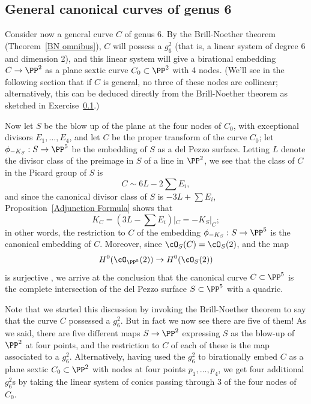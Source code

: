 \subsection{General canonical curves of genus 6}

Consider now a general curve $C$ of genus 6. By the Brill-Noether theorem (Theorem~\ref{BN omnibus}), $C$ will possess a $g^2_6$ (that is, a linear system of degree 6 and dimension 2), and this linear system will give a birational embedding $C \to \PP^2$ as a plane sextic curve $C_0 \subset \PP^2$ with 4 nodes. (We'll see in the following section that if $C$ is general, no three of these nodes are collinear; alternatively, this can be deduced directly from the Brill-Noether theorem as sketched in Exercise~\ref{}.) 

Now let $S$ be the blow up of the plane at the four nodes of $C_0$, with exceptional divisors $E_1, \dots, E_4$, and let $C$ be the proper transform of the curve $C_0$; let $\phi_{-K_S} : S \to \PP^5$ be the embedding of $S$ as a del Pezzo surface. Letting $L$ denote the divisor class of the preimage in $S$ of a line in $\PP^2$, we see that the class of $C$ in the Picard group of $S$ is
$$
C \sim 6L - 2\sum E_i,
$$ 
and since the canonical divisor class of $S$ is $-3L + \sum E_i$,  Proposition~\ref{Adjunction Formula} shows that
$$
K_C = (3L - \sum E_i)|_C = -K_S|_C;
$$ 
in other words, the restriction to $C$ of the embedding $\phi_{-K_S} : S \to \PP^5$ is the canonical embedding of $C$. Moreover, since $\cO_S(C) = \cO_S(2)$, and the map 
$$
H^0(\cO_{\PP^5}(2)) \to H^0(\cO_S(2))
$$
is surjective , we arrive at the conclusion that the canonical curve $C \subset \PP^5$ is the complete intersection of the del Pezzo surface $S \subset \PP^5$ with a quadric.

Note that we started this discussion by invoking the Brill-Noether theorem to say that the curve $C$ possessed a $g^2_6$. But in fact we now see there are five of them! As we said, there are five different maps $S \to \PP^2$ expressing $S$ as the blow-up of $\PP^2$ at four points, and the restriction to $C$ of each of these is the map associated to a $g^2_6$. Alternatively, having used the $g^2_6$ to birationally embed $C$ as a plane sextic $C_0 \subset \PP^2$ with nodes at four points $p_1,\dots,p_4$, we get four additional $g^2_6$s by taking the linear system of conics passing through 3 of the four nodes of $C_0$.

